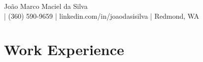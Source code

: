 \documentclass[letterpaper,11pt]{article}
\begin{document}
\begin{center}
  {\Large João Marco Maciel da Silva}\\[5pt]
  {\small \EMAIL{} | (360) 590-9659 | linkedin.com/in/joaodasisilva | Redmond, WA}\\[5pt]
\end{center}


\section{Work Experience}










\end{document}

